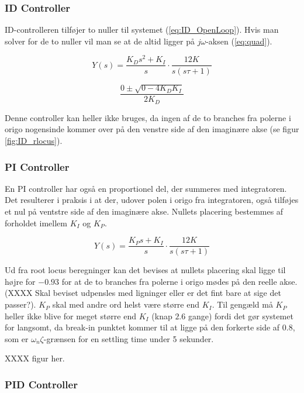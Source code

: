 \subsubsection{ID Controller}

ID-controlleren tilføjer to nuller til systemet (\ref{eq:ID_OpenLoop}). Hvis man solver for de to nuller vil man se at de altid ligger på $j\omega$-aksen (\ref{eq:quad}).

\begin{equation}\label{eq:ID_OpenLoop}
Y(s)=\frac{K_{D}s^2+K_{I}}{s}\cdot\frac{12K}{s(s\tau+1)}
\end{equation}

\begin{equation}\label{eq:quad}
\dfrac{0\pm\sqrt{0-4K_{D}K_{I}}}{2K_{D}}
\end{equation}

Denne controller kan heller ikke bruges, da ingen af de to branches fra polerne i origo nogensinde kommer over på den venstre side af den imaginære akse (se figur \ref{fig:ID_rlocus}).

\subsubsection{PI Controller}

En PI controller har også en proportionel del, der summeres med integratoren. Det resulterer i praksis i at der, udover polen i origo fra integratoren, også tilføjes et nul på ventstre side af den imaginære akse. Nullets placering bestemmes af forholdet imellem $K_{I}$ og $K_{P}$.

\begin{equation}\label{eq:PI_OpenLoop}
Y(s)=\frac{K_{P}s+K_{I}}{s}\cdot\frac{12K}{s(s\tau+1)}
\end{equation}

Ud fra root locus beregninger kan det bevises at nullets placering skal ligge til højre for $-0.93$ for at de to branches fra polerne i origo mødes på den reelle akse. (XXXX Skal beviset udpensles med ligninger eller er det fint bare at sige det passer?). $K_{P}$ skal med andre ord helst være større end $K_{I}$. Til gengæld må $K_{P}$ heller ikke blive for meget større end $K_{I}$ (knap $2.6$ gange) fordi det gør systemet for langsomt, da break-in punktet kommer til at ligge på den forkerte side af $0.8$, som er $\omega_{n}\zeta$-grænsen for en settling time under 5 sekunder. 

XXXX figur her.


\subsubsection{PID Controller}

